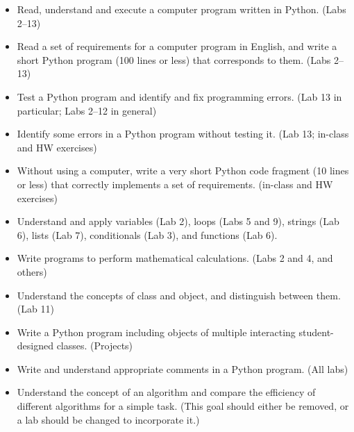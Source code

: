 \documentclass{article}
\begin{document}
\begin{itemize}
\item Read, understand and execute a computer program written in
  Python. (Labs 2--13)
\item Read a set of requirements for a computer program in English,
  and write a short Python program (100 lines or less) that
  corresponds to them. (Labs 2--13)
\item Test a Python program and identify and fix programming errors.
  (Lab 13 in particular; Labs 2--12 in general)
\item Identify some errors in a Python program without testing it.
  (Lab 13; in-class and HW exercises)
\item Without using a computer, write a very short Python code
  fragment (10 lines or less) that correctly implements a set of
  requirements. (in-class and HW exercises)
\item Understand and apply variables (Lab 2), loops (Labs 5 and 9),
  strings (Lab 6), lists (Lab 7), conditionals (Lab 3), and functions
  (Lab 6).
\item Write programs to perform mathematical calculations. (Labs 2 and
  4, and others)
\item Understand the concepts of class and object, and distinguish
  between them. (Lab 11)
\item Write a Python program including objects of multiple interacting
  student-designed classes. (Projects)
\item Write and understand appropriate comments in a Python
  program. (All labs)
\item Understand the concept of an algorithm and compare the
  efficiency of different algorithms for a simple task. (This goal
  should either be removed, or a lab should be changed to incorporate
  it.)
\end{itemize}
\end{document}
